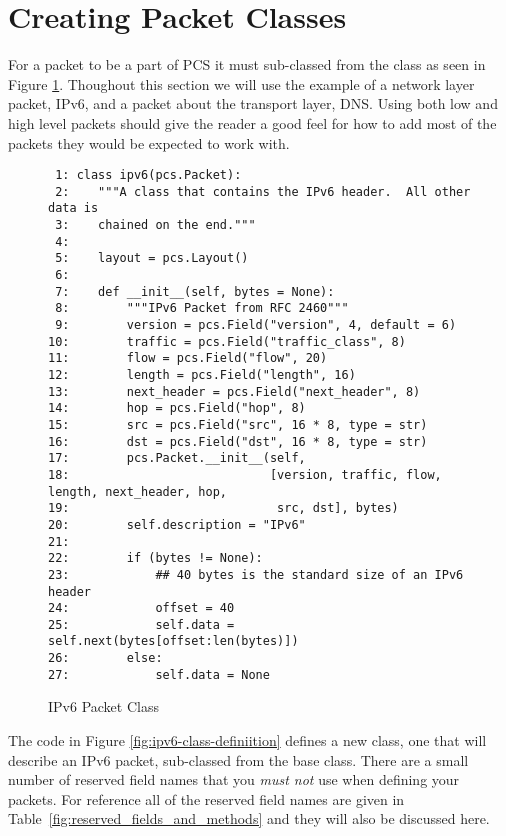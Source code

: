 \documentclass[11pt]{article}
\begin{document}
\section{Creating Packet Classes}

For a packet to be a part of PCS it must sub-classed from the 
class as seen in Figure \ref{fig:ipv6-class-definition}.  Thoughout
this section we will use the example of a network layer packet, IPv6,
and a packet about the transport layer, DNS.  Using both low and high
level packets should give the reader a good feel for how to add most
of the packets they would be expected to work with.

\begin{figure}
  \centering
\begin{verbatim}
 1: class ipv6(pcs.Packet):
 2:    """A class that contains the IPv6 header.  All other data is
 3:    chained on the end."""
 4:
 5:    layout = pcs.Layout()
 6:
 7:    def __init__(self, bytes = None):
 8:        """IPv6 Packet from RFC 2460"""
 9:        version = pcs.Field("version", 4, default = 6)
10:        traffic = pcs.Field("traffic_class", 8)
11:        flow = pcs.Field("flow", 20)
12:        length = pcs.Field("length", 16)
13:        next_header = pcs.Field("next_header", 8)
14:        hop = pcs.Field("hop", 8)
15:        src = pcs.Field("src", 16 * 8, type = str)
16:        dst = pcs.Field("dst", 16 * 8, type = str)
17:        pcs.Packet.__init__(self,
18:                            [version, traffic, flow, length, next_header, hop,
19:                             src, dst], bytes)
20:        self.description = "IPv6"
21:
22:        if (bytes != None):
23:            ## 40 bytes is the standard size of an IPv6 header
24:            offset = 40
25:            self.data = self.next(bytes[offset:len(bytes)])
26:        else:
27:            self.data = None
\end{verbatim}
  \caption{IPv6 Packet Class}
  \label{fig:ipv6-class-definition}
\end{figure}

The code in Figure \ref{fig:ipv6-class-definiition} defines a new
class, one that will describe an IPv6 packet, sub-classed from the
 base class.  There are a small number of reserved field
names that you \emph{must not} use when defining your packets.  For
reference all of the reserved field names are given in
Table~\ref{fig:reserved_fields_and_methods} and they will also be
discussed here.
\end{document}
